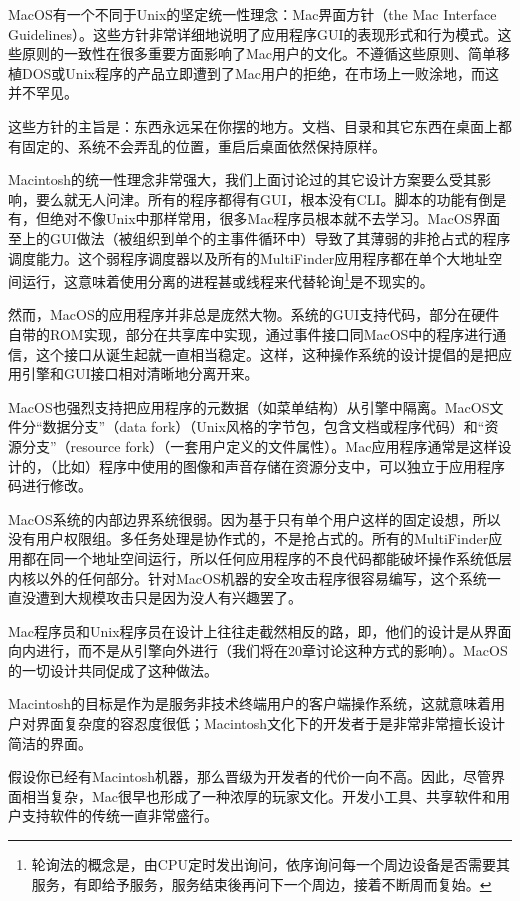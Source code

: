 \documentclass[12pt,oneside]{book}
\begin{document}
\begin{common-format}
MacOS有一个不同于Unix的坚定统一性理念：Mac畀面方针（the Mac Interface Guidelines）。这些方针非常详细地说明了应用程序GUI的表现形式和行为模式。这些原则的一致性在很多重要方面影响了Mac用户的文化。不遵循这些原则、简单移植DOS或Unix程序的产品立即遭到了Mac用户的拒绝，在市场上一败涂地，而这并不罕见。

这些方针的主旨是：东西永远呆在你摆的地方。文档、目录和其它东西在桌面上都有固定的、系统不会弄乱的位置，重启后桌面依然保持原样。

Macintosh的统一性理念非常强大，我们上面讨论过的其它设计方案要么受其影响，要么就无人问津。所有的程序都得有GUI，根本没有CLI。脚本的功能有倒是有，但绝对不像Unix中那样常用，很多Mac程序员根本就不去学习。MacOS界面至上的GUI做法（被组织到单个的主事件循环中）导致了其薄弱的非抢占式的程序调度能力。这个弱程序调度器以及所有的MultiFinder应用程序都在单个大地址空间运行，这意味着使用分离的进程甚或线程来代替轮询\footnote{轮询法的概念是，由CPU定时发出询问，依序询问每一个周边设备是否需要其服务，有即给予服务，服务结束後再问下一个周边，接着不断周而复始。}是不现实的。

然而，MacOS的应用程序并非总是庞然大物。系统的GUI支持代码，部分在硬件自带的ROM实现，部分在共享库中实现，通过事件接口同MacOS中的程序进行通信，这个接口从诞生起就一直相当稳定。这样，这种操作系统的设计提倡的是把应用引擎和GUI接口相对清晰地分离开来。

MacOS也强烈支持把应用程序的元数据（如菜单结构）从引擎中隔离。MacOS文件分“数据分支”（data fork）（Unix风格的字节包，包含文档或程序代码）和“资源分支”（resource fork）（一套用户定义的文件属性）。Mac应用程序通常是这样设计的，（比如）程序中使用的图像和声音存储在资源分支中，可以独立于应用程序码进行修改。

MacOS系统的内部边界系统很弱。因为基于只有单个用户这样的固定设想，所以没有用户权限组。多任务处理是协作式的，不是抢占式的。所有的MultiFinder应用都在同一个地址空间运行，所以任何应用程序的不良代码都能破坏操作系统低层内核以外的任何部分。针对MacOS机器的安全攻击程序很容易编写，这个系统一直没遭到大规模攻击只是因为没人有兴趣罢了。

Mac程序员和Unix程序员在设计上往往走截然相反的路，即，他们的设计是从界面向内进行，而不是从引擎向外进行（我们将在20章讨论这种方式的影响）。MacOS的一切设计共同促成了这种做法。

Macintosh的目标是作为是服务非技术终端用户的客户端操作系统，这就意味着用户对界面复杂度的容忍度很低；Macintosh文化下的开发者于是非常非常擅长设计简洁的界面。

假设你已经有Macintosh机器，那么晋级为开发者的代价一向不高。因此，尽管界面相当复杂，Mac很早也形成了一种浓厚的玩家文化。开发小工具、共享软件和用户支持软件的传统一直非常盛行。


\end{common-format}
\end{document}
